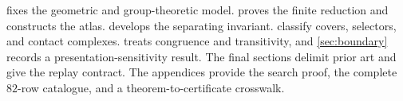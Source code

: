  fixes the geometric and group-theoretic model.
 proves the finite reduction and constructs the
atlas.   develops the separating invariant.
 classify covers, selectors, and contact
complexes.   treats congruence and transitivity, and
\cref{sec:boundary} records a presentation-sensitivity result.  The final
sections delimit prior art and give the replay contract.  The appendices
provide the search proof, the complete $82$-row catalogue, and a
theorem-to-certificate crosswalk.
